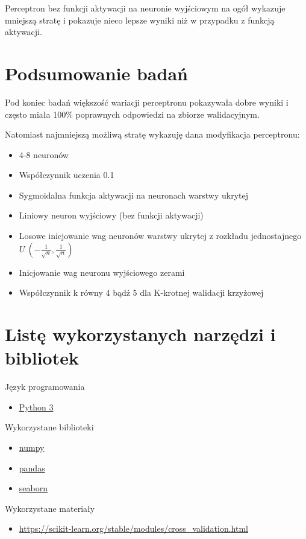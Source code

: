 \documentclass[12pt,a4paper]{article}
\begin{document}
Perceptron bez funkcji aktywacji na neuronie wyjściowym na ogół wykazuje mniejszą stratę i pokazuje nieco lepsze wyniki niż w przypadku z funkcją aktywacji.

\section{Podsumowanie badań}

Pod koniec badań większość wariacji perceptronu pokazywała dobre wyniki i często miała 100\% poprawnych odpowiedzi na zbiorze walidacyjnym.

Natomiast najmniejszą możliwą stratę wykazuję dana modyfikacja perceptronu:

\begin{itemize}
  \item   4-8 neuronów
  \item   Współczynnik uczenia 0.1
  \item   Sygmoidalna funkcja aktywacji na neuronach warstwy ukrytej
  \item   Liniowy neuron wyjściowy (bez funkcji aktywacji)
  \item   Losowe inicjowanie wag neuronów warstwy ukrytej z rozkładu jednostajnego \(U ~ (-\frac{1}{\sqrt{n}}, \frac{1}{\sqrt{n}})\)
  \item   Inicjowanie wag neuronu wyjściowego zerami
  \item   Współczynnik k równy 4 bądź 5 dla K-krotnej walidacji krzyżowej
\end{itemize}

\section{Listę wykorzystanych narzędzi i bibliotek}

Język programowania

\begin{itemize}
	\item   \href{https://www.python.org/}{Python 3}
\end{itemize}
Wykorzystane biblioteki

\begin{itemize}
	\item   \href{https://numpy.org/}{numpy}
	\item   \href{https://pandas.pydata.org/}{pandas}
	\item   \href{https://seaborn.pydata.org/}{seaborn}
\end{itemize}
Wykorzystane materiały

\begin{itemize}
	\item   \url{https://scikit-learn.org/stable/modules/cross_validation.html}
\end{itemize}
\end{document}
